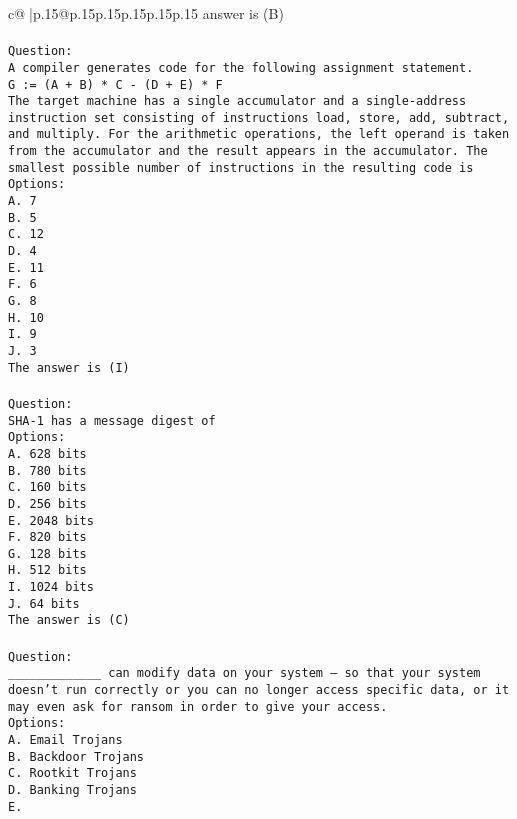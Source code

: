 \documentclass{article}
\begin{document}
{\begin{supertabular}{c@{$\;$}|p{.15\linewidth}@{}p{.15\linewidth}p{.15\linewidth}p{.15\linewidth}p{.15\linewidth}p{.15\linewidth}}
{{{answer is (B)\\ \tt \\ \tt Question:\\ \tt A compiler generates code for the following assignment statement.\\ \tt G := (A + B) * C - (D + E) * F\\ \tt The target machine has a single accumulator and a single-address instruction set consisting of instructions load, store, add, subtract, and multiply. For the arithmetic operations, the left operand is taken from the accumulator and the result appears in the accumulator. The smallest possible number of instructions in the resulting code is\\ \tt Options:\\ \tt A. 7\\ \tt B. 5\\ \tt C. 12\\ \tt D. 4\\ \tt E. 11\\ \tt F. 6\\ \tt G. 8\\ \tt H. 10\\ \tt I. 9\\ \tt J. 3\\ \tt The answer is (I)\\ \tt \\ \tt Question:\\ \tt SHA-1 has a message digest of\\ \tt Options:\\ \tt A. 628 bits\\ \tt B. 780 bits\\ \tt C. 160 bits\\ \tt D. 256 bits\\ \tt E. 2048 bits\\ \tt F. 820 bits\\ \tt G. 128 bits\\ \tt H. 512 bits\\ \tt I. 1024 bits\\ \tt J. 64 bits\\ \tt The answer is (C)\\ \tt \\ \tt Question:\\ \tt _____________ can modify data on your system – so that your system doesn’t run correctly or you can no longer access specific data, or it may even ask for ransom in order to give your access.\\ \tt Options:\\ \tt A. Email Trojans\\ \tt B. Backdoor Trojans\\ \tt C. Rootkit Trojans\\ \tt D. Banking Trojans\\ \tt E. }}}
\end{supertabular}}
\end{document}
